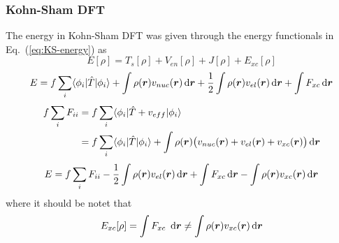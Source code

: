 \subsubsection{Kohn-Sham DFT}
The energy in Kohn-Sham DFT was given through the energy functionals in Eq.~(\ref{eq:KS-energy}) as
\begin{equation}
    E[\rho] = T_s[\rho] + V_{en}[\rho] + J[\rho] + E_{xc}[\rho]
\end{equation}
\begin{equation}
    E = f \sum_i \langle \phi_i|\hat{T}|\phi_i \rangle
	+ \int \rho(\boldsymbol r)v_{nuc}(\boldsymbol r) \,\mathrm{d}\boldsymbol r
	+ \frac{1}{2} \int \rho(\boldsymbol r)v_{el}(\boldsymbol r) \,\mathrm{d}\boldsymbol r
	+ \int F_{xc} \,\mathrm{d}\boldsymbol r
\end{equation}
\begin{align}
    f \sum_i F_{ii} &= f \sum_i \langle\phi_i|\hat{T} + v_{eff}|\phi_i\rangle\\
		    &= f \sum_i \langle\phi_i|\hat{T}|\phi_i\rangle
		     + \int \rho(\boldsymbol r)\big(v_{nuc}(\boldsymbol r) + v_{el}(\boldsymbol r) + v_{xc}(\boldsymbol r)\big) \,\mathrm{d}\boldsymbol r
\end{align}
\begin{equation}
    E = f \sum_i F_{ii} - \frac{1}{2} \int \rho(\boldsymbol r)v_{el}(\boldsymbol r) \,\mathrm{d}\boldsymbol r
	+ \int F_{xc} \,\mathrm{d}\boldsymbol r - \int \rho(\boldsymbol r)v_{xc}(\boldsymbol r) \,\mathrm{d}\boldsymbol r
\end{equation}
where it should be notet that 
\begin{equation}
    E_{xc}[\rho] = \int F_{xc} \ud\bs{r} \neq \int \rho(\bs{r})v_{xc}(\bs{r}) \ud\bs{r}
\end{equation}
